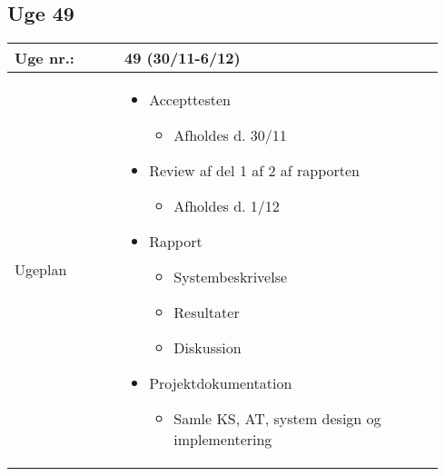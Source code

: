 	\subsection{Uge 49} \label{app:logUge49}
	\begin{longtable}{|p{0.24\linewidth}|p{0.7\linewidth}|}
		\hline
		Uge nr.: & 49 (30/11-6/12)\\ \hline
		Ugeplan & 
		\begin{itemize}
			\item Accepttesten 
			\begin{itemize}
				\item Afholdes d. 30/11
			\end{itemize}
			\item Review af del 1 af 2 af rapporten
			\begin{itemize}
				\item Afholdes d. 1/12
			\end{itemize}
			\item Rapport
			\begin{itemize}
				\item Systembeskrivelse 
				\item Resultater
				\item Diskussion
			\end{itemize}
			\item Projektdokumentation
			\begin{itemize}
				\item Samle KS, AT, system design og implementering 
			\end{itemize}
		\end{itemize}
		

\end{longtable}
